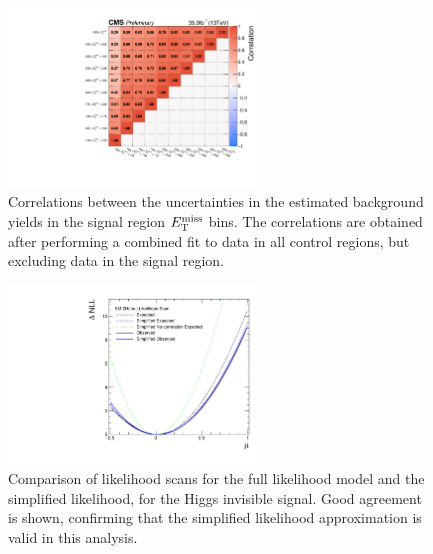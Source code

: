 \begin{figure}[hbtp]
  \centering
  \includegraphics[width=0.6\textwidth]{figures/correlation.pdf}
  \caption{
    Correlations between the uncertainties in the estimated background yields in the signal region $E_\mathrm{T}^{\mathrm{miss}}$ bins.
    The correlations are obtained after performing a combined fit to data in all control regions, but excluding data in the signal region.
  }
  \label{fig:correlation}
\end{figure}

\begin{figure}[hbtp]
  \centering
  \includegraphics[width=0.6\textwidth]{figures/smHiggs_likelihoodScan_comp.pdf}
  \caption{
    Comparison of likelihood scans for the full likelihood model and the simplified likelihood, for the Higgs invisible signal.
    Good agreement is shown, confirming that the simplified likelihood approximation is valid in this analysis.
  }
  \label{fig:simplified_likelihood_closure}
\end{figure}
